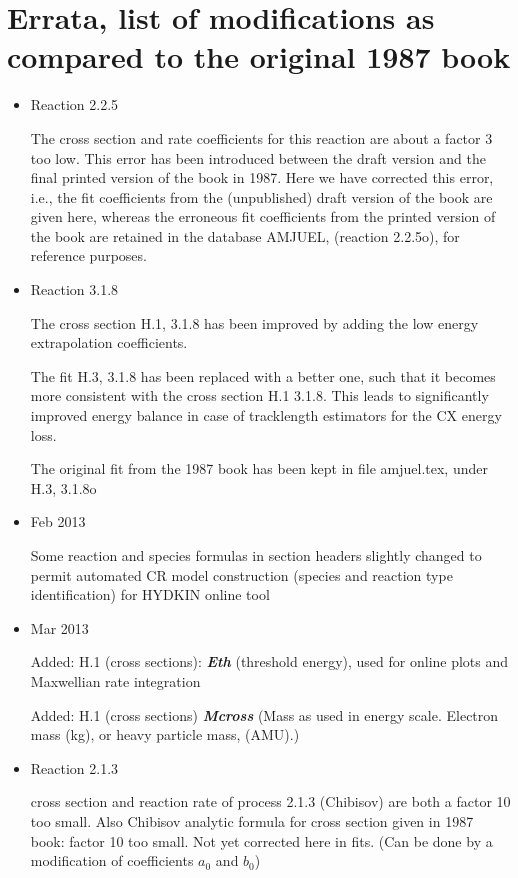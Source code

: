 \documentclass[12pt,dvipdfm]{article}
\begin{document}
\section*{Errata, list of modifications as compared to the original 1987 book}
\begin{itemize}
\item{Reaction 2.2.5}

The cross section and rate coefficients for this reaction are about a
factor 3 too low. This error has been introduced between the draft version and
the final printed version of the book in 1987. Here we have corrected this error,
i.e., the fit coefficients from the (unpublished) draft version of the book are
given here, whereas the erroneous fit coefficients from the printed version
of the book are retained in the database AMJUEL, (reaction 2.2.5o), for reference
purposes.
\item{Reaction 3.1.8}

The cross section H.1, 3.1.8 has been improved by adding
the low energy extrapolation coefficients.

The fit H.3, 3.1.8 has been replaced with a better one, such that
it becomes more consistent with the cross section H.1 3.1.8.
This leads to significantly improved energy balance in case of
tracklength estimators for the CX energy loss.

The original fit from the 1987 book has been kept in file amjuel.tex,
under H.3, 3.1.8o
\item{Feb 2013}

Some reaction and species formulas in section headers slightly changed to permit automated CR
model construction (species and reaction type identification) for HYDKIN online tool
\item{Mar 2013}

Added: H.1 (cross sections): \textbf{\emph{Eth}} (threshold energy), used for online plots and Maxwellian rate integration

Added: H.1 (cross sections) \textbf{\emph{Mcross}} (Mass as used in energy scale. Electron mass (kg), or heavy particle mass, (AMU).)

\item{Reaction 2.1.3}

cross section and reaction rate of process 2.1.3 (Chibisov) are both a factor 10 too small.
Also Chibisov analytic formula for cross section given in 1987 book: factor 10 too small.
Not yet corrected here in fits. (Can be done by a modification of coefficients $a_0$ and $b_0$)


\end{itemize}
\end{document}
